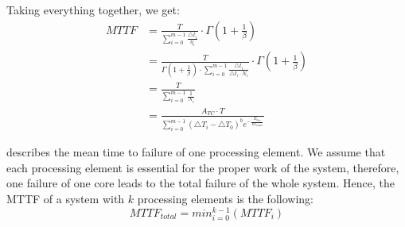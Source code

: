 Taking everything together, we get:
\begin{align}
  MTTF & = \frac{T}{\sum_{i=0}^{m-1} \frac{\triangle t_i}{\eta_i}} \cdot \Gamma(1 + \frac{1}{\beta}) \nonumber \\
  & = \frac{T}{\Gamma(1 + \frac{1}{\beta}) \cdot \sum_{i=0}^{m-1} \frac{\triangle t_i}{\triangle t_i \cdot N_i}} \cdot \Gamma(1 + \frac{1}{\beta}) \nonumber \\
  & = \frac{T}{\sum_{i=0}^{m-1} \frac{1}{N_i}} \nonumber \\
  & = \frac{A_{TC} \cdot T}{\sum_{i=0}^{m-1} (\triangle T_i - \triangle T_0)^b e^{- \frac{E_{a_{TC}}}{k T_{max i}}}} \label{eq:one-mttf}
\end{align}

 describes the mean time to failure of one processing element. We assume that each processing element is essential for the proper work of the system, therefore, one failure of one core leads to the total failure of the whole system. Hence, the MTTF of a system with $k$ processing elements is the following:
\[
  MTTF_{total} = min_{i=0}^{k-1}(MTTF_i)
\]
